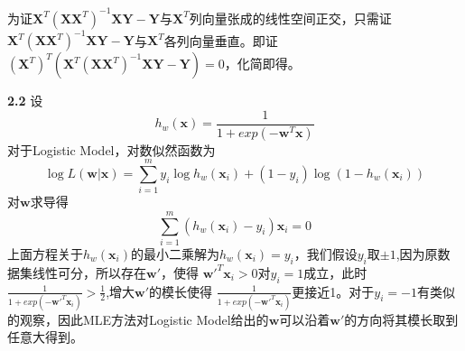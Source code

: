 \documentclass{article}
\begin{document}
为证$\bm{X}^T(\bm{X}\bm{X}^T)^{-1}\bm{X}\bm{Y} - \bm{Y}$与$\bm{X}^T$列向量张成的线性空间正交，只需证
$\bm{X}^T(\bm{X}\bm{X}^T)^{-1}\bm{X}\bm{Y} - \bm{Y}$与$\bm{X}^T$各列向量垂直。即证
$(\bm{X}^T)^T \left(\bm{X}^T(\bm{X}\bm{X}^T)^{-1}\bm{X}\bm{Y} - \bm{Y}\right)=0$，化简即得。

\textbf{2.2}
设
\begin{equation}
h_w(\bm{x})=\frac{1}{1+exp(-\bm{w}^T\bm{x})}
\end{equation}
对于Logistic Model，对数似然函数为
\begin{equation}
\log L(\bm{w}|\bm{x})=\sum_{i=1}^m y_i \log h_w(\bm{x}_i) + (1-y_i) \log (1-h_w(\bm{x}_i))
\end{equation}
对$\bm{w}$求导得
\begin{equation}
\sum_{i=1}^m(h_w(\bm{x}_i)-y_i)\bm{x}_i=0
\end{equation}
上面方程关于$h_w(\bm{x}_i)$的最小二乘解为$h_w(\bm{x}_i)=y_i$，我们假设$y_i$取$\pm 1$,因为原数据集线性可分，所以存在$\bm{w'}$，使得
$\bm{w'}^T\bm{x}_i>0$对$y_i=1$成立，此时$\frac{1}{1+exp(-\bm{w'}^T\bm{x}_i)}>\frac{1}{2}$,增大$\bm{w'}$的模长使得
$\frac{1}{1+exp(-\bm{w'}^T\bm{x}_i)}$更接近1。对于$y_i=-1$有类似的观察，因此MLE方法对Logistic Model给出的$\bm{w}$可以沿着$\bm{w'}$的方向将其模长取到任意大得到。
\end{document}
